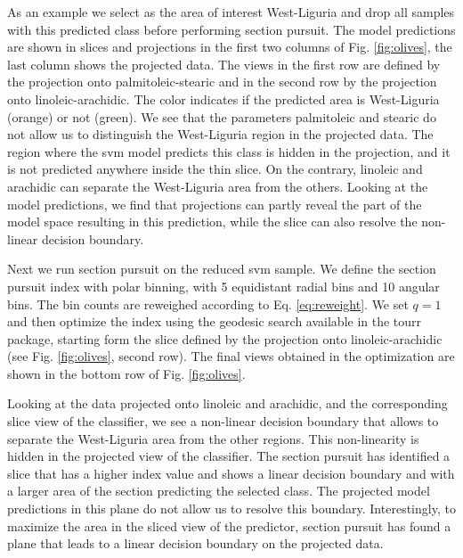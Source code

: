 \documentclass[]{interact}
\theoremstyle{plain}%
\theoremstyle{definition}
\theoremstyle{remark}
\begin{document}
As an example we select as the area of interest West-Liguria and drop
all samples with this predicted class before performing section pursuit.
The model predictions are shown in slices and projections in the first
two columns of Fig. \ref{fig:olives}, the last column shows the
projected data. The views in the first row are defined by the projection
onto palmitoleic-stearic and in the second row by the projection onto
linoleic-arachidic. The color indicates if the predicted area is
West-Liguria (orange) or not (green). We see that the parameters
palmitoleic and stearic do not allow us to distinguish the West-Liguria
region in the projected data. The region where the svm model predicts
this class is hidden in the projection, and it is not predicted anywhere
inside the thin slice. On the contrary, linoleic and arachidic can
separate the West-Liguria area from the others. Looking at the model
predictions, we find that projections can partly reveal the part of the
model space resulting in this prediction, while the slice can also
resolve the non-linear decision boundary.

Next we run section pursuit on the reduced svm sample. We define the
section pursuit index with polar binning, with 5 equidistant radial bins
and 10 angular bins. The bin counts are reweighed according to Eq.
\ref{eq:reweight}. We set \(q=1\) and then optimize the index using the
geodesic search available in the tourr package, starting form the slice
defined by the projection onto linoleic-arachidic (see Fig.
\ref{fig:olives}, second row). The final views obtained in the
optimization are shown in the bottom row of Fig. \ref{fig:olives}.

Looking at the data projected onto linoleic and arachidic, and the
corresponding slice view of the classifier, we see a non-linear decision
boundary that allows to separate the West-Liguria area from the other
regions. This non-linearity is hidden in the projected view of the
classifier. The section pursuit has identified a slice that has a higher
index value and shows a linear decision boundary and with a larger area
of the section predicting the selected class. The projected model
predictions in this plane do not allow us to resolve this boundary.
Interestingly, to maximize the area in the sliced view of the predictor,
section pursuit has found a plane that leads to a linear decision
boundary on the projected data.
\end{document}
